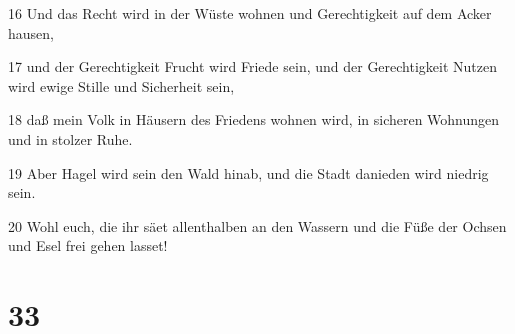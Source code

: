 \par 16 Und das Recht wird in der Wüste wohnen und Gerechtigkeit auf dem Acker hausen,
\par 17 und der Gerechtigkeit Frucht wird Friede sein, und der Gerechtigkeit Nutzen wird ewige Stille und Sicherheit sein,
\par 18 daß mein Volk in Häusern des Friedens wohnen wird, in sicheren Wohnungen und in stolzer Ruhe.
\par 19 Aber Hagel wird sein den Wald hinab, und die Stadt danieden wird niedrig sein.
\par 20 Wohl euch, die ihr säet allenthalben an den Wassern und die Füße der Ochsen und Esel frei gehen lasset!

\chapter{33}

